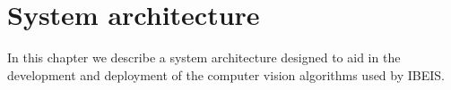 






\newcommand{\DependencyCache}{Dependency Cache}

\chapter{System architecture}\label{chap:system}

    In this chapter we describe a system architecture designed to aid in the
      development and deployment of the computer vision algorithms used by
      IBEIS{}.


